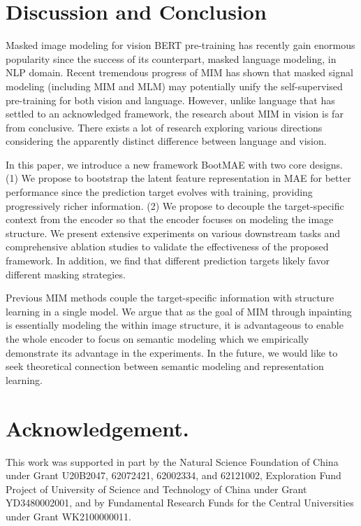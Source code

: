 \documentclass[runningheads]{llncs}
\begin{document}
\vspace{-1mm}
\section{Discussion and Conclusion}
\vspace{-1mm}
Masked image modeling for vision BERT pre-training has recently gain enormous popularity since the success of its counterpart, masked language modeling, in NLP domain. Recent tremendous progress of MIM has shown that masked signal modeling (including MIM and MLM) may potentially unify the self-supervised pre-training for both vision and language.
However, unlike language that has settled to an acknowledged framework, the research about MIM in vision is far from conclusive. There exists a lot of research exploring various directions considering the apparently distinct difference between language and vision.

In this paper, we introduce a new framework BootMAE with two core designs. 
(1) We propose to bootstrap the latent feature representation in MAE for better performance since the prediction target evolves with training, providing progressively richer information.
(2) We propose to decouple the target-specific context from the encoder so that the encoder focuses on modeling the image structure.
We present extensive experiments on various downstream tasks and comprehensive ablation studies to validate the effectiveness of the proposed framework.
In addition, we find that different prediction targets likely favor different masking strategies.

Previous MIM methods couple the target-specific information with structure learning in a single model. We argue that as the goal of MIM through inpainting is essentially modeling the within image structure, 
it is advantageous to enable the whole encoder to focus on semantic modeling which we empirically demonstrate its advantage in the experiments. In the future, we would like to seek theoretical connection between semantic modeling and representation learning.

\section{Acknowledgement.}
\noindent This work was supported in part by the Natural Science Foundation of China
under Grant U20B2047, 62072421, 62002334, and 62121002, Exploration Fund Project of University of Science and Technology of China under Grant YD3480002001, and by Fundamental Research Funds for the Central Universities under Grant WK2100000011.
\end{document}
